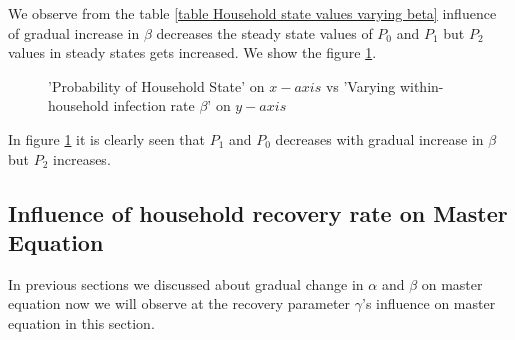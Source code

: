\documentclass[paper=a4, fontsize=11pt, twoside, BCOR=12mm, parskip=full, listof=totoc]{scrreprt}
\begin{document}
{We observe from the table \ref{table Household state values varying beta} influence of gradual increase in $\beta$ decreases the steady state values of $P_0$ and $P_1$ but $P_2$ values in steady states gets increased. We show the figure \ref{discrete beta values}.   
\begin{figure}[H]
\centering 
\caption{'Probability of Household State' on $x-axis$ vs 'Varying within-household infection rate $\beta$' on $y-axis$}
\label{discrete beta values}
\end{figure}
In figure \ref{discrete beta values} it is clearly seen that $P_1$ and $P_0$ decreases with gradual increase in $\beta$ but $P_2$ increases. 
\subsection*{Influence of household recovery rate on Master Equation}
\label{observation gamma parameter} 
In previous sections we discussed about gradual change in $\alpha$ and $\beta$ on master equation now we will observe at the recovery parameter $\gamma$'s influence on master equation in this section. 

}
\end{document}
